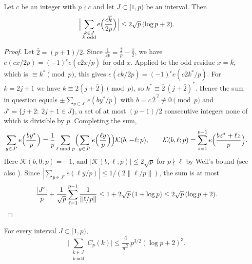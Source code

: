 \begin{lemma}[Weil]\label{lem:weil}
Let $c$ be an integer with $p\nmid c$ and let $J\subset[1,p)$ be an interval. Then
\[
\Big|\sum_{\substack{k\in J\\ k\text{ odd}}}e\Bigl(\frac{c\overline{k}}{2p}\Bigr)\Big|\le2\sqrt p\,(\log p+2).
\]
\end{lemma}

\begin{proof}
Let $\overline{2}=(p+1)/2$. Since $\frac1{2p}=\frac{\overline{2}}{p}-\frac12$, we have
$e(cx/2p)=(-1)^ce(c\overline{2}x/p)$ for odd $x$. Applied to the odd residue $x=\overline{k}$, which is $\equiv k^*\pmod
p$, this gives $e(c\overline{k}/2p)=(-1)^ce(c\overline{2}k^*/p)$. For $k=2j+1$ we have $k\equiv2(j+\overline{2})\pmod
p$, so $k^*\equiv\overline{2}\,(j+\overline{2})^*$. Hence the sum in question equals $\pm\sum_{y\in J'}e(by^*/p)$ with
$b=c\,\overline{2}^{\,2}\not\equiv0\pmod p$ and $J'=\{j+\overline{2}:\ 2j+1\in J\}$, a set of at most $(p-1)/2$
consecutive integers none of which is divisible by $p$. Completing the sum,
\[
\sum_{y\in J'}e\Bigl(\frac{by^*}{p}\Bigr)=\frac1p\sum_{\ell\bmod p}\Bigl(\sum_{y\in J'}e\Bigl(\frac{\ell y}{p}\Bigr)\Bigr)
\mathcal{K}(b,-\ell;p),\qquad\mathcal{K}(b,\ell;p)=\sum_{z=1}^{p-1}e\Bigl(\frac{bz^*+\ell z}{p}\Bigr).
\]
Here $\mathcal{K}(b,0;p)=-1$, and $|\mathcal{K}(b,\ell;p)|\le2\sqrt p$ for $p\nmid\ell$ by Weil's bound \cite{b29}
(see also \cite{b15}). Since $|\sum_{y\in J'}e(\ell y/p)|\le1/(2\|\ell/p\|)$, the sum is at most
\[
\frac{|J'|}{p}+\frac1{\sqrt p}\sum_{\ell=1}^{p-1}\frac1{\|\ell/p\|}\le1+2\sqrt p\,(1+\log p)\le2\sqrt p\,(\log p+2).
\qedhere
\]
\end{proof}

\begin{lemma}\label{lem:Cp-interval}
For every interval $J\subset[1,p)$,
\[
\Big|\sum_{\substack{k\in J\\ k\text{ odd}}}C_p(k)\Big|\le\frac4{\pi^2}\,p^{3/2}(\log p+2)^3.
\]
\end{lemma}

